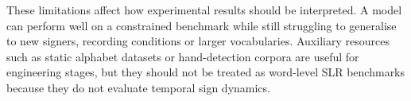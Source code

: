 These limitations affect how experimental results should be interpreted. A model can perform well
on a constrained benchmark while still struggling to generalise to new signers, recording
conditions or larger vocabularies. Auxiliary resources such as static alphabet datasets or
hand-detection corpora are useful for engineering stages, but they should not be treated as
word-level SLR benchmarks because they do not evaluate temporal sign dynamics.